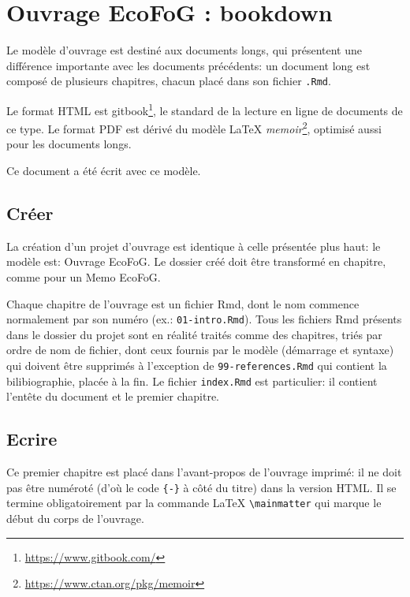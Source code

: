\documentclass[
  11pt,
  french,
  a4paper,
  extrafontsizes,onecolumn,openright
  ]{memoir}
\begin{document}
\hypertarget{ouvrage-ecofog-bookdown}{%
\section{Ouvrage EcoFoG : bookdown}\label{ouvrage-ecofog-bookdown}}

Le modèle d'ouvrage est destiné aux documents longs, qui présentent une différence importante avec les documents précédents: un document long est composé de plusieurs chapitres, chacun placé dans son fichier \texttt{.Rmd}.

Le format HTML est gitbook\footnote{\url{https://www.gitbook.com/}}, le standard de la lecture en ligne de documents de ce type.
Le format PDF est dérivé du modèle LaTeX \emph{memoir}\footnote{\url{https://www.ctan.org/pkg/memoir}}, optimisé aussi pour les documents longs.

Ce document a été écrit avec ce modèle.

\hypertarget{cruxe9er-1}{%
\subsection{Créer}\label{cruxe9er-1}}

La création d'un projet d'ouvrage est identique à celle présentée plus haut: le modèle est: Ouvrage EcoFoG. Le dossier créé doit être transformé en chapitre, comme pour un Memo EcoFoG.

Chaque chapitre de l'ouvrage est un fichier Rmd, dont le nom commence normalement par son numéro (ex.: \texttt{01-intro.Rmd}).
Tous les fichiers Rmd présents dans le dossier du projet sont en réalité traités comme des chapitres, triés par ordre de nom de fichier, dont ceux fournis par le modèle (démarrage et syntaxe) qui doivent être supprimés à l'exception de \texttt{99-references.Rmd} qui contient la bilibiographie, placée à la fin.
Le fichier \texttt{index.Rmd} est particulier: il contient l'entête du document et le premier chapitre.

\hypertarget{ecrire-1}{%
\subsection{Ecrire}\label{ecrire-1}}

Ce premier chapitre est placé dans l'avant-propos de l'ouvrage imprimé: il ne doit pas être numéroté (d'où le code \texttt{\{-\}} à côté du titre) dans la version HTML.
Il se termine obligatoirement par la commande LaTeX \texttt{\textbackslash{}mainmatter} qui marque le début du corps de l'ouvrage.
\end{document}
